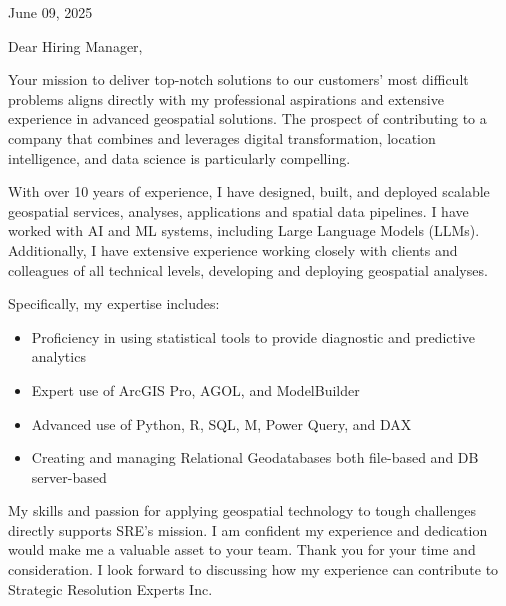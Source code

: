 \documentclass[letterpaper]{article}
\newenvironment{itemlist}
        {
            \vspace{-12pt}
            \begin{itemize} \itemsep 0pt
        }{
            \end{itemize}
            \vspace{-3pt}
        }
\begin{document}
\large

\null\hfill June 09, 2025

Dear Hiring Manager,

Your mission to
deliver top-notch solutions to our customers’ most difficult problems
aligns directly with my professional aspirations and extensive experience in advanced geospatial solutions.
The prospect of contributing to a company that combines and leverages
digital transformation, location intelligence, and data science
is particularly compelling.

With over 10 years of experience, I have designed, built, and deployed scalable
geospatial services, analyses, applications and spatial data pipelines.
I have worked with AI and ML systems, including Large Language Models (LLMs).
Additionally, I have extensive experience working closely with clients and colleagues
of all technical levels, developing and deploying geospatial analyses.

Specifically, my expertise includes:  
\begin{itemlist}
\item Proficiency in using statistical tools to provide diagnostic and predictive analytics
\item Expert use of ArcGIS Pro, AGOL, and ModelBuilder
\item Advanced use of Python, R, SQL, M, Power Query, and DAX
\item Creating and managing Relational Geodatabases both file-based and DB server-based
\end{itemlist}

My skills and passion for applying geospatial technology to tough
challenges directly supports SRE’s mission. 
I am confident my experience and dedication would make me a valuable asset to your team. 
Thank you for your time and consideration. 
I look forward to discussing how my experience can contribute to Strategic Resolution Experts Inc.
\end{document}
